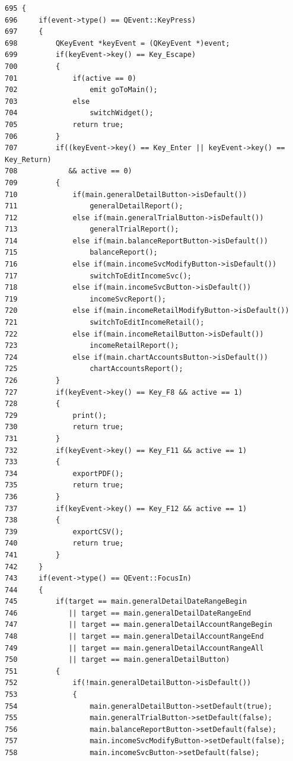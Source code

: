 \footnotesize\begin{verbatim}695 {
696     if(event->type() == QEvent::KeyPress)
697     {
698         QKeyEvent *keyEvent = (QKeyEvent *)event;
699         if(keyEvent->key() == Key_Escape)
700         {
701             if(active == 0)
702                 emit goToMain();
703             else
704                 switchWidget();
705             return true;
706         }
707         if((keyEvent->key() == Key_Enter || keyEvent->key() == Key_Return)
708            && active == 0)
709         {
710             if(main.generalDetailButton->isDefault())
711                 generalDetailReport();
712             else if(main.generalTrialButton->isDefault())
713                 generalTrialReport();
714             else if(main.balanceReportButton->isDefault())
715                 balanceReport();
716             else if(main.incomeSvcModifyButton->isDefault())
717                 switchToEditIncomeSvc();
718             else if(main.incomeSvcButton->isDefault())
719                 incomeSvcReport();
720             else if(main.incomeRetailModifyButton->isDefault())
721                 switchToEditIncomeRetail();
722             else if(main.incomeRetailButton->isDefault())
723                 incomeRetailReport();
724             else if(main.chartAccountsButton->isDefault())
725                 chartAccountsReport();
726         }
727         if(keyEvent->key() == Key_F8 && active == 1)
728         {
729             print();
730             return true;
731         }
732         if(keyEvent->key() == Key_F11 && active == 1)
733         {
734             exportPDF();
735             return true;
736         }
737         if(keyEvent->key() == Key_F12 && active == 1)
738         {
739             exportCSV();
740             return true;
741         }
742     }
743     if(event->type() == QEvent::FocusIn)
744     {
745         if(target == main.generalDetailDateRangeBegin
746            || target == main.generalDetailDateRangeEnd
747            || target == main.generalDetailAccountRangeBegin
748            || target == main.generalDetailAccountRangeEnd
749            || target == main.generalDetailAccountRangeAll
750            || target == main.generalDetailButton)
751         {
752             if(!main.generalDetailButton->isDefault())
753             {
754                 main.generalDetailButton->setDefault(true);
755                 main.generalTrialButton->setDefault(false);
756                 main.balanceReportButton->setDefault(false);
757                 main.incomeSvcModifyButton->setDefault(false);
758                 main.incomeSvcButton->setDefault(false);

\end{verbatim}
